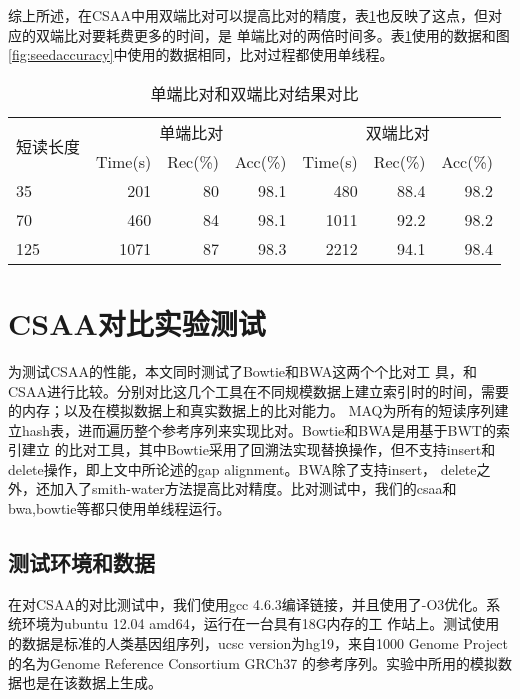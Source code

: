 综上所述，在CSAA中用双端比对可以提高比对的精度，表\ref{tab:alignmentaccuracy}也反映了这点，但对应的双端比对要耗费更多的时间，是
单端比对的两倍时间多。表\ref{tab:alignmentaccuracy}使用的数据和图\ref{fig:seedaccuracy}中使用的数据相同，比对过程都使用单线程。

\begin{table}[htbp]
    \caption{单端比对和双端比对结果对比}
    \label{tab:alignmentaccuracy}
    \centering
    \begin{tabular}{lrrrrrr}
        \toprule
        \multirow{2}{*}{短读长度} & \multicolumn{3}{c}{单端比对} & \multicolumn{3}{c}{双端比对}\\
        \cline{2-4}
        \cline{5-7}
        &Time(s) &Rec(\%) &Acc(\%) &Time(s) &Rec(\%) &Acc(\%)\\
        \midrule
        35 &201 &80 &98.1 &480 &88.4 &98.2 \\
        70 &460 &84 &98.1 &1011 &92.2 &98.2 \\
        125 &1071 &87 &98.3 &2212 &94.1 &98.4 \\
        \bottomrule
    \end{tabular}
\end{table}



\section{CSAA对比实验测试}

为测试CSAA的性能，本文同时测试了Bowtie\cite{langmead2009ultrafast}和BWA\cite{li2009fast}这两个个比对工
具，和CSAA进行比较。分别对比这几个工具在不同规模数据上建立索引时的时间，需要的内存；以及在模拟数据上和真实数据上的比对能力。
MAQ为所有的短读序列建立hash表，进而遍历整个参考序列来实现比对。Bowtie和BWA是用基于BWT的索引建立
的比对工具，其中Bowtie采用了回溯法实现替换操作，但不支持insert和delete操作，即上文中所论述的gap alignment。BWA除了支持insert，
delete之外，还加入了smith-water方法提高比对精度。比对测试中，我们的csaa和bwa,bowtie等都只使用单线程运行。

\subsection{测试环境和数据}

在对CSAA的对比测试中，我们使用gcc 4.6.3编译链接，并且使用了-O3优化。系统环境为ubuntu 12.04 amd64，运行在一台具有18G内存的工
作站上。测试使用的数据是标准的人类基因组序列，ucsc version为hg19，来自1000 Genome Project的名为Genome Reference Consortium GRCh37
的参考序列。实验中所用的模拟数据也是在该数据上生成。

